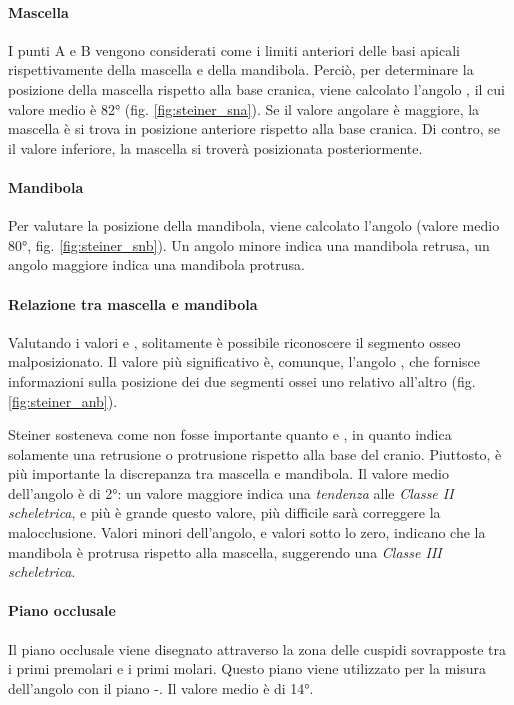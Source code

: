 \paragraph{Mascella}
I punti A e B vengono considerati come i limiti anteriori delle basi apicali rispettivamente della mascella e della mandibola. Perciò, per determinare la posizione della mascella rispetto alla base cranica, viene calcolato l'angolo , il cui valore medio è 82° (fig. \vref{fig:steiner_sna}). Se il valore angolare è maggiore, la mascella è si trova in posizione anteriore rispetto alla base cranica. Di contro, se il valore inferiore, la mascella si troverà posizionata posteriormente.

\paragraph{Mandibola}
Per valutare la posizione della mandibola, viene calcolato l'angolo  (valore medio 80°, fig. \ref{fig:steiner_snb}). Un angolo minore indica una mandibola retrusa, un angolo maggiore indica una mandibola protrusa.

\paragraph{Relazione tra mascella e mandibola}
Valutando i valori  e , solitamente è possibile riconoscere il segmento osseo malposizionato. Il valore più significativo è, comunque, l'angolo , che fornisce informazioni sulla posizione dei due segmenti ossei uno relativo all'altro (fig. \vref{fig:steiner_anb}).

Steiner sosteneva come  non fosse importante quanto  e , in quanto indica solamente una retrusione o protrusione rispetto alla base del cranio. Piuttosto, è più importante la discrepanza tra mascella e mandibola. Il valore medio dell'angolo  è di 2°: un valore maggiore indica una \textit{tendenza} alle \textit{Classe II scheletrica}, e più è grande questo valore, più difficile sarà correggere la malocclusione. Valori minori dell'angolo, e valori sotto lo zero, indicano che la mandibola è protrusa rispetto alla mascella, suggerendo una \textit{Classe III scheletrica}.

\paragraph{Piano occlusale}
Il piano occlusale viene disegnato attraverso la zona delle cuspidi sovrapposte tra i primi premolari e i primi molari. Questo piano viene utilizzato per la misura dell'angolo con il piano -. Il valore medio è di 14°.

